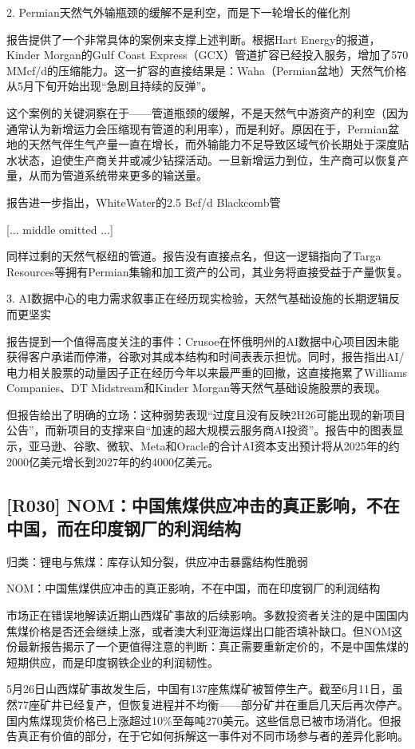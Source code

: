 \documentclass[11pt]{ctexart}
\begin{document}
2. Permian天然气外输瓶颈的缓解不是利空，而是下一轮增长的催化剂

报告提供了一个非常具体的案例来支撑上述判断。根据Hart Energy的报道，Kinder Morgan的Gulf Coast Express（GCX）管道扩容已经投入服务，增加了570 MMcf/d的压缩能力。这一扩容的直接结果是：Waha（Permian盆地）天然气价格从5月下旬开始出现“急剧且持续的反弹”。

这个案例的关键洞察在于——管道瓶颈的缓解，不是天然气中游资产的利空（因为通常认为新增运力会压缩现有管道的利用率），而是利好。原因在于，Permian盆地的天然气伴生气产量一直在增长，而外输能力不足导致区域气价长期处于深度贴水状态，迫使生产商关井或减少钻探活动。一旦新增运力到位，生产商可以恢复产量，从而为管道系统带来更多的输送量。

报告进一步指出，WhiteWater的2.5 Bcf/d Blackcomb管

[... middle omitted ...]

同样过剩的天然气枢纽的管道。报告没有直接点名，但这一逻辑指向了Targa Resources等拥有Permian集输和加工资产的公司，其业务将直接受益于产量恢复。

3. AI数据中心的电力需求叙事正在经历现实检验，天然气基础设施的长期逻辑反而更坚实

报告提到一个值得高度关注的事件：Crusoe在怀俄明州的AI数据中心项目因未能获得客户承诺而停滞，谷歌对其成本结构和时间表表示担忧。同时，报告指出AI/电力相关股票的动量因子正在经历今年以来最严重的回撤，这直接拖累了Williams Companies、DT Midstream和Kinder Morgan等天然气基础设施股票的表现。

但报告给出了明确的立场：这种弱势表现“过度且没有反映2H26可能出现的新项目公告”，而新项目的支撑来自“加速的超大规模云服务商AI投资”。报告中的图表显示，亚马逊、谷歌、微软、Meta和Oracle的合计AI资本支出预计将从2025年的约2000亿美元增长到2027年的约4000亿美元。

\subsection{[R030] NOM：中国焦煤供应冲击的真正影响，不在中国，而在印度钢厂的利润结构}
{\small\color{refgray}归类：锂电与焦煤：库存认知分裂，供应冲击暴露结构性脆弱}

NOM：中国焦煤供应冲击的真正影响，不在中国，而在印度钢厂的利润结构

市场正在错误地解读近期山西煤矿事故的后续影响。多数投资者关注的是中国国内焦煤价格是否还会继续上涨，或者澳大利亚海运煤出口能否填补缺口。但NOM这份最新报告揭示了一个更值得注意的判断：真正需要重新定价的，不是中国焦煤的短期供应，而是印度钢铁企业的利润韧性。

5月26日山西煤矿事故发生后，中国有137座焦煤矿被暂停生产。截至6月11日，虽然77座矿井已经复产，但恢复进程并不均衡——部分矿井在重启几天后再次停产。国内焦煤现货价格已上涨超过10\%至每吨270美元。这些信息已被市场消化。但报告真正有价值的部分，在于它如何拆解这一事件对不同市场参与者的差异化影响。
\end{document}
